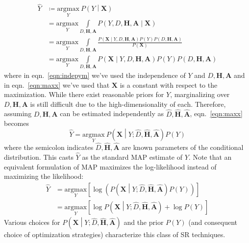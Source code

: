 \begin{align}
    \hat{Y} & \coloneqq \underset{Y}{\text{argmax}}~P\left( Y \middle| \bm{X} \right) \nonumber                                                                                        \\
            & = \underset{Y}{\text{argmax}} \int\limits_{D, \bm{H}, \bm{A}} P\left( Y, D, \bm{H}, \bm{A} \middle| \bm{X}\right) \nonumber                                                     \\
            & = \underset{Y}{\text{argmax}} \int\limits_{D, \bm{H}, \bm{A}} \frac{P\left(\bm{X} \middle| Y, D, \bm{H}, \bm{A} \right)P(Y) P(D, \bm{H}, \bm{A})}{P(\bm{X})}\label{eqn:indepym} \\
            & = \underset{Y}{\text{argmax}} \int\limits_{D, \bm{H}, \bm{A}} P\left(\bm{X} \middle| Y, D, \bm{H}, \bm{A} \right)P(Y) P(D, \bm{H}, \bm{A}) \label{eqn:maxx}
\end{align}
where in eqn.~\eqref{eqn:indepym} we've used the independence of \(Y\) and \(D, \bm{H}, \bm{A}\) \cite{Hardie1997} and in eqn.~\eqref{eqn:maxx} we've used that \(\bm{X}\) is a constant with respect to the maximization.
%
While there exist reasonable priors for \(Y\), marginalizing over \(D, \bm{H}, \bm{A}\) is still difficult due to the high-dimensionality of each.
%
Therefore, assuming \(D, \bm{H}, \bm{A}\) can be estimated independently as \(\hat{D}, \hat{\bm{H}}, \hat{\bm{A}}\), eqn.~\eqref{eqn:maxx} becomes
\begin{equation}
    \hat{Y} = \underset{Y}{\text{argmax}}~P\left(\bm{X} \middle| Y; \hat{D}, \hat{\bm{H}}, \hat{\bm{A}} \right) P(Y)
    \label{eqn:map}
\end{equation}
where the semicolon indicates \(\hat{D}, \hat{\bm{H}}, \hat{\bm{A}}\) are known parameters of the conditional distribution.
%
This casts \(\hat{Y}\) as the standard MAP estimate of \(Y\).
%
Note that an equivalent formulation of MAP maximizes the log-likelihood instead of maximizing the likelihood:
\begin{align}
    \hat{Y} & = \underset{Y}{\text{argmax}}\left[ \log\left( P\left(\bm{X} \middle| Y; \hat{D},  \hat{\bm{H}}, \hat{\bm{A}}\right) P(Y) \right) \right]  \nonumber \\
            & =  \underset{Y}{\text{argmax}}\left[ \log{P\left(\bm{X} \middle| Y; \hat{D},  \hat{\bm{H}}, \hat{\bm{A}} \right)} + \log{P(Y)} \right]
    \label{eqn:logmap}
\end{align}
%
Various choices for \(P\left(\bm{X} \middle| Y; \hat{D},  \hat{\bm{H}}, \hat{\bm{A}} \right)\) and the prior \(P(Y)\) (and consequent choice of optimization strategies) characterize this class of SR techniques.
